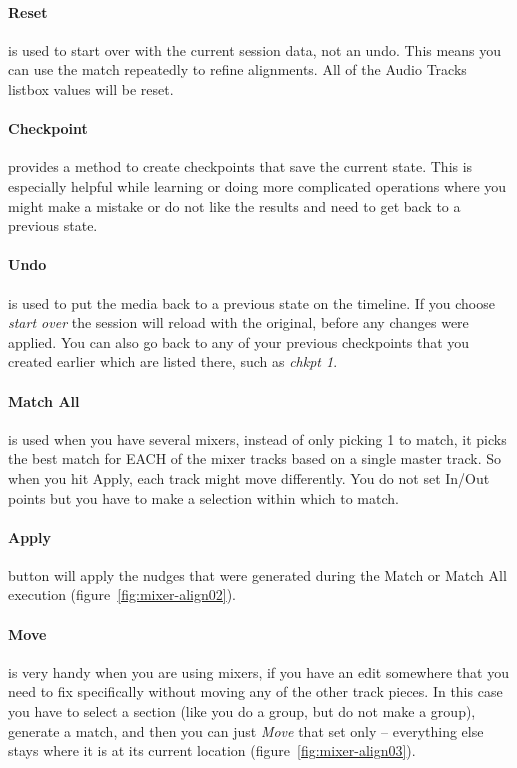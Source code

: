 \paragraph{Reset} is used to start over with the current session data, not an undo.  This means you can use the match repeatedly to refine alignments.  All of the Audio Tracks listbox values will be reset.

\paragraph{Checkpoint} provides a method to create checkpoints that save the current state.  This is especially helpful while learning or doing more complicated operations where you might make a mistake or do not like the results and need to get back to a previous state.

\paragraph{Undo} is used to put the media back to a previous state on the timeline.  If you choose \textit{start over} the session will reload with the original, before any changes were applied.  You can also go back to any of your previous checkpoints that you created earlier which are listed there, such as \textit{chkpt 1}.

\paragraph{Match All}is used when you have several mixers, instead of only picking 1 to match, it picks the best match for EACH of the mixer tracks based on a single master track. So when you hit Apply, each track might move differently. You do not set In/Out points but you have to make a selection within which to match.

\paragraph{Apply} button will apply the nudges that were generated during the Match or Match All execution (figure~\ref{fig:mixer-align02}).

\paragraph{Move} is very handy when you are using mixers, if you have an edit somewhere that you need to fix specifically without moving any of the other track pieces. In this case you have to select a section (like you do a group, but do not make a group), generate a match, and then you can just \textit{Move} that set only -- everything else stays where it is at its current location (figure~\ref{fig:mixer-align03}).

